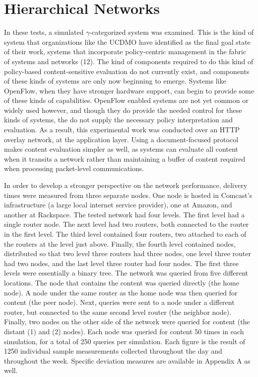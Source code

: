 \section{Hierarchical Networks}
In these tests, a simulated $\gamma$-categorized system was examined.  This is the kind of system that organizations like the UCDMO have identified as the final goal state of their work, systems that incorporate policy-centric management in the fabric of systems and networks (12).  The kind of components required to do this kind of policy-based content-sensitive evaluation do not currently exist, and components of these kinds of systems are only now beginning to emerge.  Systems like OpenFlow, when they have stronger hardware support, can begin to provide some of these kinds of capabilities.  OpenFlow enabled systems are not yet common or widely used however, and though they do provide the needed control for these kinds of systems, the do not supply the necessary policy interpretation and evaluation.  As a result, this experimental work was conducted over an HTTP overlay network, at the application layer.  Using a document-focused protocol makes content evaluation simpler as well, as systems can evaluate all content when it transits a network rather than maintaining a buffer of content required when processing packet-level communications.

In order to develop a stronger perspective on the network performance, delivery times were measured from three separate nodes.   One node is hosted in Comcast's infrastructure (a large local internet service provider), one at Amazon, and another at Rackspace.  The tested network had four levels.  The first level had a single router node.  The next level had two routers, both connected to the router in the first level.  The third level contained four routers, two attached to each of the routers at the level just above.  Finally, the fourth level contained nodes, distributed so that two level three routers had three nodes, one level three router had two nodes, and the last level three router had four nodes.  The first three levels were essentially a binary tree.  The network was queried from five different locations.  The node that contains the content was queried directly (the home node).  A node under the same router as the home node was then queried for content (the peer node).  Next, queries were sent to a node under a different router, but connected to the same second level router (the neighbor node).  Finally, two nodes on the other side of the network were queried for content (the distant (1) and (2) nodes).  Each node was queried for content 50 times in each simulation, for a total of 250 queries per simulation.  Each figure is the result of 1250 individual sample measurements collected throughout the day and throughout the week.  Specific deviation measures are available in Appendix A as well.

